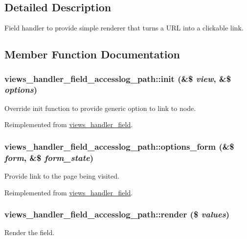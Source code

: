 \subsection{Detailed Description}
Field handler to provide simple renderer that turns a URL into a clickable link. 

\subsection{Member Function Documentation}
\hypertarget{classviews__handler__field__accesslog__path_a9f0e65ae8a7fbc2ef5986c3519da67b2}{
\subsubsection[{init}]{\setlength{\rightskip}{0pt plus 5cm}views\_\-handler\_\-field\_\-accesslog\_\-path::init (\&\$ {\em view}, \/  \&\$ {\em options})}}
\label{classviews__handler__field__accesslog__path_a9f0e65ae8a7fbc2ef5986c3519da67b2}
Override init function to provide generic option to link to node. 

Reimplemented from \hyperlink{classviews__handler__field_a3a290c7df3ead81e5cd244ad5335b1cc}{views\_\-handler\_\-field}.\hypertarget{classviews__handler__field__accesslog__path_ab8bfda464a205057cd730081aa5981c8}{
\subsubsection[{options\_\-form}]{\setlength{\rightskip}{0pt plus 5cm}views\_\-handler\_\-field\_\-accesslog\_\-path::options\_\-form (\&\$ {\em form}, \/  \&\$ {\em form\_\-state})}}
\label{classviews__handler__field__accesslog__path_ab8bfda464a205057cd730081aa5981c8}
Provide link to the page being visited. 

Reimplemented from \hyperlink{classviews__handler__field_a0435d161922b7b4b84f02a2e79bb947a}{views\_\-handler\_\-field}.\hypertarget{classviews__handler__field__accesslog__path_ab40b3461a6c122c052753537346089b1}{
\subsubsection[{render}]{\setlength{\rightskip}{0pt plus 5cm}views\_\-handler\_\-field\_\-accesslog\_\-path::render (\$ {\em values})}}
\label{classviews__handler__field__accesslog__path_ab40b3461a6c122c052753537346089b1}
Render the field.


